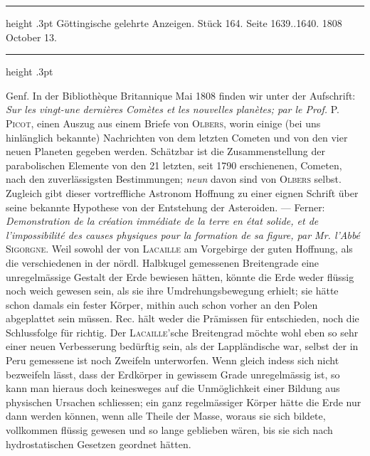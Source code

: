 \par\bigskip
\hypertarget{native-512-lower}{}\label{native-512-lower}
\begin{center}\parbox{.85\linewidth}{\centering\small
\hrule height .3pt\relax\vspace{2.5pt}
Göttingische gelehrte Anzeigen. Stück 164. Seite 1639..1640. 1808 October 13.\par
\vspace{2.5pt}\hrule height .3pt\relax
}\end{center}

Genf. In der Bibliothèque Britannique Mai 1808 finden wir unter der Aufschrift: \emph{Sur les vingt-une dernières Comètes et les nouvelles planètes; par le Prof.} \textsc{P. Picot}, einen Auszug aus einem Briefe von \textsc{Olbers}, worin einige (bei uns hinlänglich bekannte) Nachrichten von dem letzten Cometen und von den vier neuen Planeten gegeben werden. Schätzbar ist die Zusammenstellung der parabolischen Elemente von den 21 letzten, seit 1790 erschienenen, Cometen, nach den zuverlässigsten Bestimmungen; \emph{neun} davon sind von \textsc{Olbers} selbst. Zugleich gibt dieser vortreffliche Astronom Hoffnung zu einer eignen Schrift über seine bekannte Hypothese von der Entstehung der Asteroiden. --- Ferner: \emph{Demonstration de la création immédiate de la terre en état solide, et de l'impossibilité des causes physiques pour la formation de sa figure, par Mr. l'Abbé} \textsc{Sigorgne}. Weil sowohl der von \textsc{Lacaille} am Vorgebirge der guten Hoffnung, als die verschiedenen in der nördl. Halbkugel gemessenen Breitengrade eine unregelmässige Gestalt der Erde bewiesen hätten, könnte die Erde weder flüssig noch weich gewesen sein, als sie ihre Umdrehungsbewegung erhielt; sie hätte schon damals ein fester Körper, mithin auch schon vorher an den Polen abgeplattet sein müssen. Rec. hält weder die Prämissen für entschieden, noch die Schlussfolge für richtig. Der \textsc{Lacaille}'sche Breitengrad möchte wohl eben so sehr einer neuen Verbesserung bedürftig sein, als der Lappländische war, selbst der in Peru gemessene ist noch Zweifeln unterworfen. Wenn gleich indess sich nicht bezweifeln lässt, dass der Erdkörper in gewissem Grade unregelmässig ist, so kann man hieraus doch keinesweges auf die Unmöglichkeit einer Bildung aus physischen Ursachen schliessen; ein ganz regelmässiger Körper hätte die Erde nur dann werden können, wenn alle Theile der Masse, woraus sie sich bildete, vollkommen flüssig gewesen und so lange geblieben wären, bis sie sich nach hydrostatischen Gesetzen geordnet hätten.
